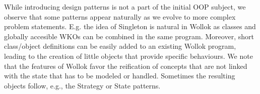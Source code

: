 While introducing design patterns is not a part of the initial OOP subject, we observe that some patterns appear naturally as we evolve to more complex problem statements. E.g. the idea of Singleton is natural in  Wollok as classes and globally accesible WKOs can be combined in the same program. Moreover, short class/object definitions can be easily added to an existing Wollok program, leading to the creation of little objects that provide specific behaviours. We note that the features of Wollok favor the reification of concepts that are not linked with the state that has to be modeled or handled. Sometimes the resulting objects follow, e.g., the Strategy or State\cite{Gamm93b} patterns.

